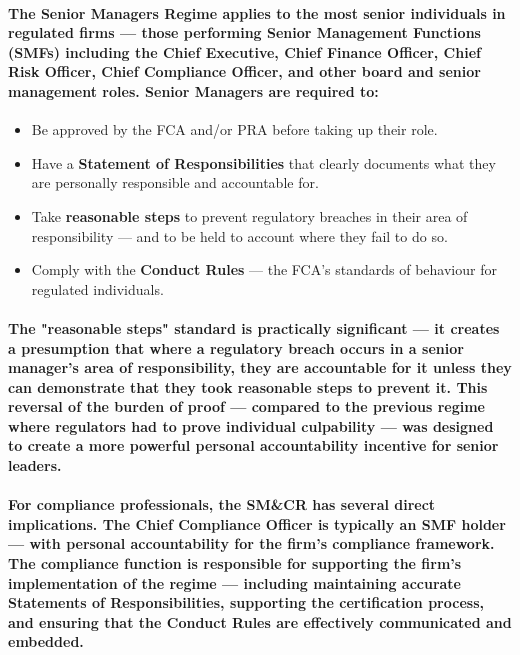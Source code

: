 \paragraph{The \textbf{Senior Managers Regime} applies to the most senior individuals in regulated firms — those performing \textbf{Senior Management Functions (SMFs)} including the Chief Executive, Chief Finance Officer, Chief Risk Officer, Chief Compliance Officer, and other board and senior management roles. Senior Managers are required to:}
\begin{itemize}
    \item{Be approved by the FCA and/or PRA before taking up their role.}
    \item{Have a \textbf{Statement of Responsibilities} that clearly documents what they are personally responsible and accountable for.}
    \item{Take \textbf{reasonable steps} to prevent regulatory breaches in their area of responsibility — and to be held to account where they fail to do so.}
    \item{Comply with the \textbf{Conduct Rules} — the FCA's standards of behaviour for regulated individuals.}
\end{itemize}
\paragraph{The \textbf{"reasonable steps" standard} is practically significant — it creates a presumption that where a regulatory breach occurs in a senior manager's area of responsibility, they are accountable for it unless they can demonstrate that they took reasonable steps to prevent it. This reversal of the burden of proof — compared to the previous regime where regulators had to prove individual culpability — was designed to create a more powerful personal accountability incentive for senior leaders.}
\paragraph{For compliance professionals, the SM\&CR has several direct implications. The Chief Compliance Officer is typically an SMF holder — with personal accountability for the firm's compliance framework. The compliance function is responsible for supporting the firm's implementation of the regime — including maintaining accurate Statements of Responsibilities, supporting the certification process, and ensuring that the Conduct Rules are effectively communicated and embedded.}

